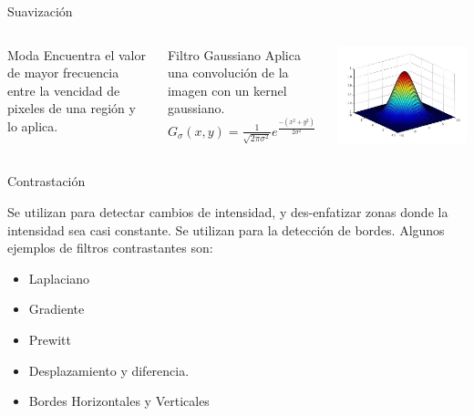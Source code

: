 \documentclass{beamer}
\begin{document}
\begin{frame}{Suavización}

\begin{columns}
\column[t]{5cm}
\begin{block}{Moda}
\justifying
Encuentra el valor de mayor frecuencia entre la vencidad de pixeles de una región y lo aplica.
\end{block}

\begin{block}{Filtro Gaussiano}
\justifying
Aplica una convolución de la imagen con un kernel gaussiano.
\begin{math}
G_{\sigma}(x,y)=\frac{1}{\sqrt{2\pi\sigma^2}}e^\frac{-(x^2+y^2)}{2\sigma^2}
\end{math}
\end{block}

\column[t]{5cm}

\begin{center}
\includegraphics[scale=0.30]{./.Presentation/gauss.jpg}
\end{center}

\end{columns}
\end{frame}

\begin{frame}{Contrastación}

 Se utilizan para detectar cambios de intensidad, y des-enfatizar zonas donde la intensidad sea casi constante. Se utilizan para la detección de bordes. Algunos ejemplos de filtros contrastantes son: 
 
 \begin{itemize}
 \item Laplaciano
 \item Gradiente
 \item Prewitt
 \item Desplazamiento y diferencia.
 \item Bordes Horizontales y Verticales
 \end{itemize}
\end{frame}
\end{document}
